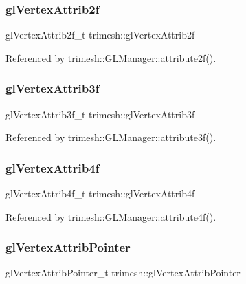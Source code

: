 \subsubsection{\texorpdfstring{gl\+Vertex\+Attrib2f}{glVertexAttrib2f}}
{\footnotesize\ttfamily gl\+Vertex\+Attrib2f\+\_\+t trimesh\+::gl\+Vertex\+Attrib2f\hspace{0.3cm}{\ttfamily [static]}}



Referenced by trimesh\+::\+G\+L\+Manager\+::attribute2f().

\mbox{\label{namespacetrimesh_a2cb7297d0172b4d4f852af31b1ba28ff}} 
\subsubsection{\texorpdfstring{gl\+Vertex\+Attrib3f}{glVertexAttrib3f}}
{\footnotesize\ttfamily gl\+Vertex\+Attrib3f\+\_\+t trimesh\+::gl\+Vertex\+Attrib3f\hspace{0.3cm}{\ttfamily [static]}}



Referenced by trimesh\+::\+G\+L\+Manager\+::attribute3f().

\mbox{\label{namespacetrimesh_aa0b596fa07237d00a8c63baa033a8feb}} 
\subsubsection{\texorpdfstring{gl\+Vertex\+Attrib4f}{glVertexAttrib4f}}
{\footnotesize\ttfamily gl\+Vertex\+Attrib4f\+\_\+t trimesh\+::gl\+Vertex\+Attrib4f\hspace{0.3cm}{\ttfamily [static]}}



Referenced by trimesh\+::\+G\+L\+Manager\+::attribute4f().

\mbox{\label{namespacetrimesh_afd1f61dc31435df23ab80ae8e9946019}} 
\subsubsection{\texorpdfstring{gl\+Vertex\+Attrib\+Pointer}{glVertexAttribPointer}}
{\footnotesize\ttfamily gl\+Vertex\+Attrib\+Pointer\+\_\+t trimesh\+::gl\+Vertex\+Attrib\+Pointer\hspace{0.3cm}{\ttfamily [static]}}

